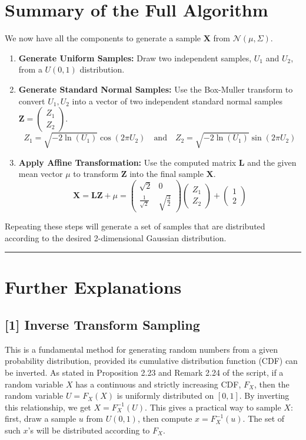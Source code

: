 \documentclass[11pt,a4paper]{article}
\newcommand{\N}{\mathcal{N}}
\newcommand{\mat}[1]{\mathbf{#1}}
\begin{document}
\section{Summary of the Full Algorithm}

We now have all the components to generate a sample $\mat{X}$ from $\N(\mu, \Sigma)$.

\begin{enumerate}
    \item \textbf{Generate Uniform Samples:} Draw two independent samples, $U_1$ and $U_2$, from a $U(0,1)$ distribution.

    \item \textbf{Generate Standard Normal Samples:} Use the Box-Muller transform to convert $U_1, U_2$ into a vector of two independent standard normal samples $\mat{Z} = \begin{pmatrix} Z_1 \\ Z_2 \end{pmatrix}$.
    \[
    Z_1 = \sqrt{-2 \ln(U_1)} \cos(2\pi U_2) \quad \text{and} \quad Z_2 = \sqrt{-2 \ln(U_1)} \sin(2\pi U_2)
    \]

    \item \textbf{Apply Affine Transformation:} Use the computed matrix $\mat{L}$ and the given mean vector $\mu$ to transform $\mat{Z}$ into the final sample $\mat{X}$.
    \[ \mat{X} = \mat{L}\mat{Z} + \mu = \begin{pmatrix} \sqrt{2} & 0 \\ \frac{1}{\sqrt{2}} & \sqrt{\frac{3}{2}} \end{pmatrix} \begin{pmatrix} Z_1 \\ Z_2 \end{pmatrix} + \begin{pmatrix} 1 \\ 2 \end{pmatrix} \]
\end{enumerate}
Repeating these steps will generate a set of samples that are distributed according to the desired 2-dimensional Gaussian distribution.

\hrule
\vspace{1cm}
\section*{Further Explanations}

\subsection*{[1] Inverse Transform Sampling} \label{concept:its}
This is a fundamental method for generating random numbers from a given probability distribution, provided its cumulative distribution function (CDF) can be inverted. As stated in Proposition 2.23 and Remark 2.24 of the script, if a random variable $X$ has a continuous and strictly increasing CDF, $F_X$, then the random variable $U = F_X(X)$ is uniformly distributed on $[0,1]$. By inverting this relationship, we get $X = F_X^{-1}(U)$. This gives a practical way to sample $X$: first, draw a sample $u$ from $U(0,1)$, then compute $x = F_X^{-1}(u)$. The set of such $x$'s will be distributed according to $F_X$.
\end{document}
